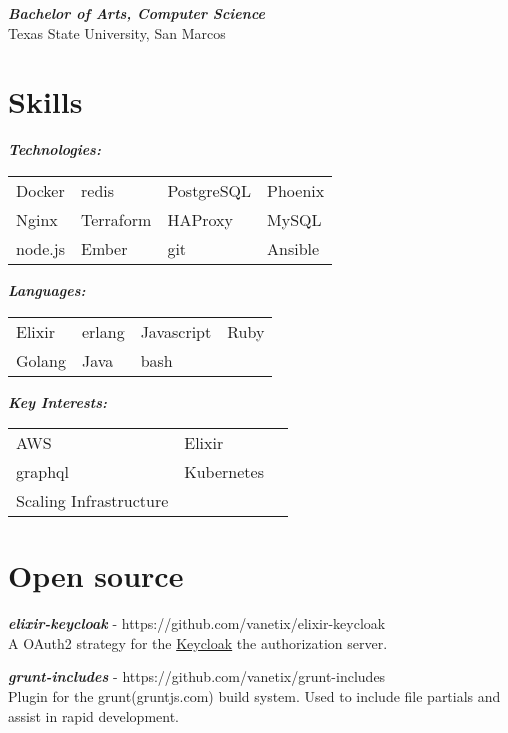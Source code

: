 \documentclass[line,margin]{res}
\begin{document}
\begin{resume}
\textit{\textbf{Bachelor of Arts, Computer Science}} \\
Texas State University, San Marcos

\section{Skills}

\textit{\textbf{Technologies:}} \\
\begin{tabular}{l l l l}
  Docker & redis & PostgreSQL & Phoenix \\
  Nginx & Terraform & HAProxy & MySQL \\
  node.js & Ember & git & Ansible
\end{tabular}

\textit{\textbf{Languages:}} \\
\begin{tabular}{l l l l}
  Elixir & erlang & Javascript & Ruby \\
  Golang & Java & bash
\end{tabular}

\textit{\textbf{Key Interests:}} \\
\begin{tabular}{l l l }
  AWS & Elixir \\
  graphql & Kubernetes \\
  Scaling Infrastructure
\end{tabular}

\section{Open source}

\textit{\textbf{elixir-keycloak}} - https://github.com/vanetix/elixir-keycloak \\
A OAuth2 strategy for the \href{https://www.keycloak.org}{Keycloak} the authorization server.

\textit{\textbf{grunt-includes}} - https://github.com/vanetix/grunt-includes \\
Plugin for the grunt(gruntjs.com) build system. Used to include file partials and assist in rapid development.

\end{resume}
\end{document}
